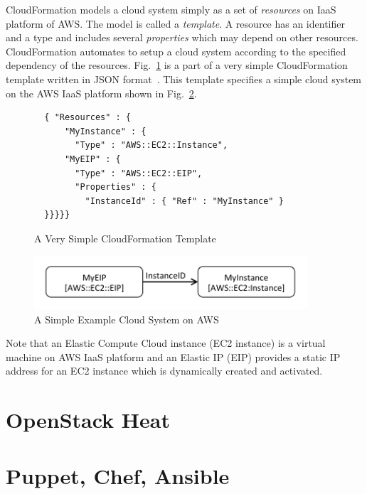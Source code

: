 \documentclass[12pt]{report}
\begin{document}
CloudFormation models a cloud system simply as a set of {\it
  resources} on IaaS platform of AWS. The model is called a {\it
  template}. A resource has an identifier and a type and includes
several {\it properties} which may depend on other
resources. CloudFormation automates to setup a cloud system according
to the specified dependency of the
resources. Fig.~\ref{fig:AWSExample} is a part of a very simple
CloudFormation template written in JSON format~\cite{JSON}.
This template specifies a simple cloud system on the AWS IaaS platform
shown in Fig.~\ref{fig:exampleaws}.
\begin{figure}
\begin{verbatim}
  { "Resources" : {
      "MyInstance" : {
        "Type" : "AWS::EC2::Instance",
      "MyEIP" : {
        "Type" : "AWS::EC2::EIP",
        "Properties" : {
          "InstanceId" : { "Ref" : "MyInstance" }
  }}}}}
\end{verbatim}
\vspace{-0.6cm}
\caption{A Very Simple CloudFormation Template}
\label{fig:AWSExample}
\end{figure}
\begin{figure}
\centering
\includegraphics[height=2cm,natwidth=396,natheight=78]{./exaws.png}
\caption{A Simple Example Cloud System on AWS}
\label{fig:exampleaws}
\end{figure}
Note that an Elastic Compute Cloud instance (EC2 instance) is a
virtual machine on AWS IaaS platform and an Elastic IP (EIP)
provides a static IP address for an EC2 instance which is dynamically
created and activated.

\section{OpenStack Heat}
\label{sec:heat}

\section{Puppet, Chef, Ansible}
\label{sec:PCA}
\end{document}
